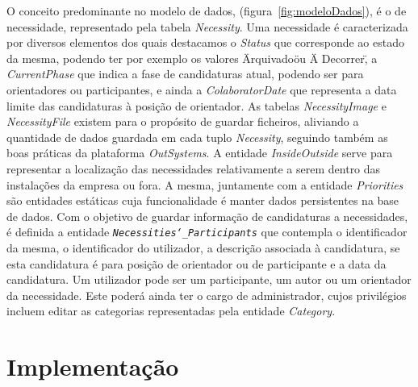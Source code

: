 O conceito predominante no modelo de dados, (figura~\ref{fig:modeloDados}), é o de necessidade, representado pela tabela \textit{Necessity}. 
Uma necessidade é caracterizada por diversos elementos dos quais destacamos o \textit{Status} que corresponde ao estado da mesma, 
podendo ter por exemplo os valores \"Arquivado\" ou \"A Decorrer\", a \textit{CurrentPhase} que indica a fase de candidaturas atual, 
podendo ser para orientadores ou participantes, e ainda a \textit{ColaboratorDate} que representa a data limite das candidaturas 
à posição de orientador. 
As tabelas \textit{NecessityImage} e \textit{NecessityFile} existem para o propósito de guardar ficheiros, 
aliviando a quantidade de dados guardada em cada tuplo \textit{Necessity}, 
seguindo também as boas práticas da plataforma \textit{OutSystems}. 
A entidade \textit{InsideOutside} serve para representar a localização das necessidades relativamente a serem 
dentro das instalações da empresa ou fora. A mesma, juntamente com a entidade \textit{Priorities} 
são entidades estáticas cuja funcionalidade é manter dados persistentes na base de dados.
Com o objetivo de guardar informação de candidaturas a necessidades, é definida a entidade \texttt{\textit{Necessities\char`_Participants}} que 
contempla o identificador da mesma, o identificador do utilizador, a descrição associada à candidatura, 
se esta candidatura é para posição de orientador ou de participante e a data da candidatura. 
Um utilizador pode ser um participante, um autor ou um orientador da necessidade. 
Este poderá ainda ter o cargo de administrador, cujos privilégios incluem editar as categorias representadas pela 
entidade \textit{Category}.

\section{Implementação}\label{sec:implementação}


